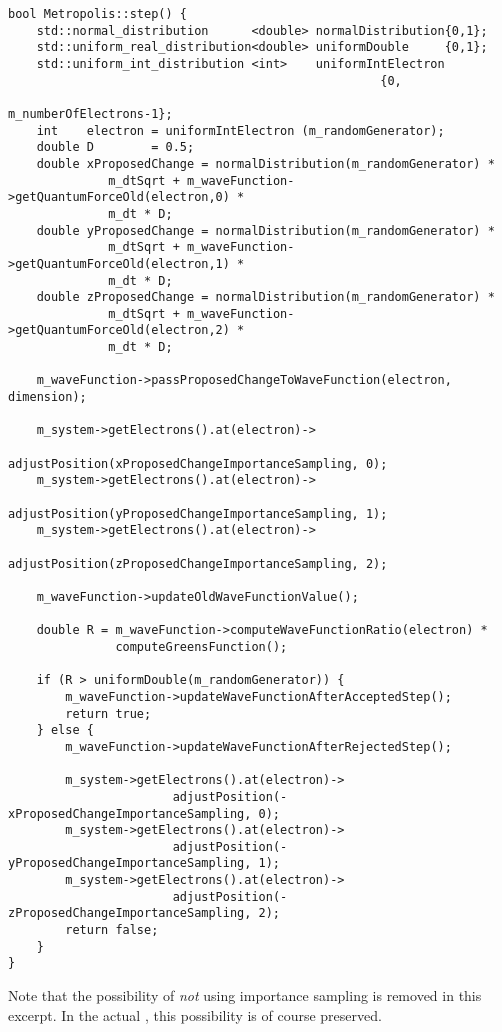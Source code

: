 \documentclass[../../master.tex]{subfiles}
\begin{document}
\begin{lstlisting}[language={[std]c++}]
bool Metropolis::step() {
    std::normal_distribution      <double> normalDistribution{0,1};
    std::uniform_real_distribution<double> uniformDouble     {0,1};
    std::uniform_int_distribution <int>    uniformIntElectron 
                                                    {0, 
                                                     m_numberOfElectrons-1};
    int    electron = uniformIntElectron (m_randomGenerator);
    double D        = 0.5;
    double xProposedChange = normalDistribution(m_randomGenerator) *
              m_dtSqrt + m_waveFunction->getQuantumForceOld(electron,0) *
              m_dt * D;
    double yProposedChange = normalDistribution(m_randomGenerator) *
              m_dtSqrt + m_waveFunction->getQuantumForceOld(electron,1) *
              m_dt * D;
    double zProposedChange = normalDistribution(m_randomGenerator) *
              m_dtSqrt + m_waveFunction->getQuantumForceOld(electron,2) *
              m_dt * D;

    m_waveFunction->passProposedChangeToWaveFunction(electron, dimension);
    
    m_system->getElectrons().at(electron)->
                       adjustPosition(xProposedChangeImportanceSampling, 0);
    m_system->getElectrons().at(electron)->
                       adjustPosition(yProposedChangeImportanceSampling, 1);
    m_system->getElectrons().at(electron)->
                       adjustPosition(zProposedChangeImportanceSampling, 2);

    m_waveFunction->updateOldWaveFunctionValue();
    
    double R = m_waveFunction->computeWaveFunctionRatio(electron) *
               computeGreensFunction();
    
    if (R > uniformDouble(m_randomGenerator)) {
        m_waveFunction->updateWaveFunctionAfterAcceptedStep();
        return true;
    } else {
        m_waveFunction->updateWaveFunctionAfterRejectedStep();

        m_system->getElectrons().at(electron)->
                       adjustPosition(-xProposedChangeImportanceSampling, 0);
        m_system->getElectrons().at(electron)->
                       adjustPosition(-yProposedChangeImportanceSampling, 1);
        m_system->getElectrons().at(electron)->
                       adjustPosition(-zProposedChangeImportanceSampling, 2);
        return false;
    }
}
\end{lstlisting}
Note that the possibility of \emph{not} using importance sampling is removed in this excerpt. In the actual , this possibility is of course preserved.
\end{document}

